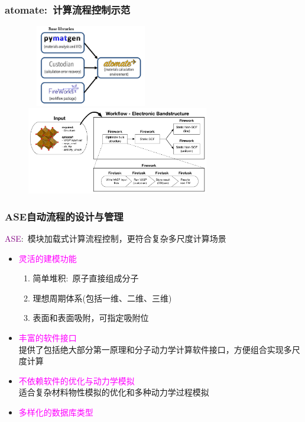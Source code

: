 \frame
{
	\frametitle{\textrm{atomate}:~计算流程控制示范}
\begin{figure}[h!]
\centering
\vspace*{-0.19in}
\includegraphics[height=1.4in,width=2.2in,viewport=0 0 820 630,clip]{Figures/Atomate_comp.png}
\vskip 1pt
\includegraphics[height=1.5in]{Figures/bandstructure_wf.png}
\label{Logo_QM-MM}
\end{figure} 
}

\frame
{
	\frametitle{\textrm{ASE}自动流程的设计与管理}
		\textcolor{purple}{\textrm{ASE}}:~模块加载式计算流程控制，更符合复杂多尺度计算场景
		\begin{itemize}
			\item \textcolor{magenta}{灵活的建模功能}
				\begin{enumerate}
    \setlength{\itemsep}{10pt}
					\item 简单堆积:~原子直接组成分子
					\item 理想周期体系(包括一维、二维、三维)
					\item 表面和表面吸附，可指定吸附位
				\end{enumerate}
			\item \textcolor{magenta}{丰富的软件接口}\\
				提供了包括绝大部分第一原理和分子动力学计算软件接口，方便组合实现多尺度计算
			\item \textcolor{magenta}{不依赖软件的优化与动力学模拟}\\
				适合复杂材料物性模拟的优化和多种动力学过程模拟
			\item \textcolor{magenta}{多样化的数据库类型}
		\end{itemize} 
}


